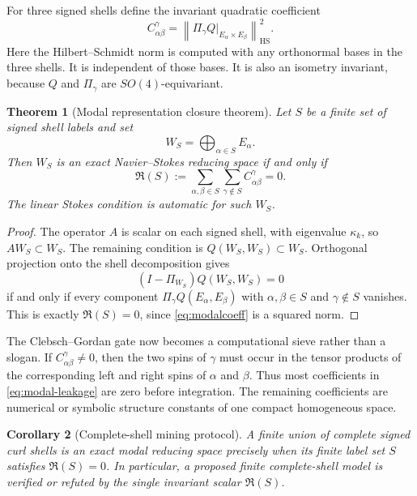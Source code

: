 \documentclass[aps,prd,reprint,superscriptaddress,nofootinbib,floatfix]{revtex4-2}
\newtheorem{theorem}{Theorem}
\newtheorem{corollary}[theorem]{Corollary}
\theoremstyle{definition}
\theoremstyle{remark}
\begin{document}
For three signed shells define the invariant quadratic coefficient
\begin{equation}
	C_{\alpha\beta}^{\gamma}
	=
	\left\|\Pi_\gamma Q\big|_{E_\alpha\times E_\beta}\right\|_{\mathrm{HS}}^2 .
	\label{eq:modalcoeff}
\end{equation}
Here the Hilbert--Schmidt norm is computed with any orthonormal bases in the three shells.  It is independent of those bases.  It is also an isometry invariant, because \(Q\) and \(\Pi_\gamma\) are \(SO(4)\)-equivariant.

\begin{theorem}[Modal representation closure theorem]\label{thm:modalclosure}
	Let \(S\) be a finite set of signed shell labels and set
	\[
		W_S=\bigoplus_{\alpha\in S}E_\alpha .
	\]
	Then \(W_S\) is an exact Navier--Stokes reducing space if and only if
	\begin{equation}
		\mathfrak R(S):=
		\sum_{\alpha,\beta\in S}\sum_{\gamma\notin S}
		C_{\alpha\beta}^{\gamma}=0.
		\label{eq:modal-leakage}
	\end{equation}
	The linear Stokes condition is automatic for such \(W_S\).
\end{theorem}

\begin{proof}
	The operator \(A\) is scalar on each signed shell, with eigenvalue \(\kappa_k\), so \(AW_S\subset W_S\).  The remaining condition is \(Q(W_S,W_S)\subset W_S\).  Orthogonal projection onto the shell decomposition gives
	\[
		(I-\Pi_{W_S})Q(W_S,W_S)=0
	\]
	if and only if every component \(\Pi_\gamma Q(E_\alpha,E_\beta)\) with \(\alpha,\beta\in S\) and \(\gamma\notin S\) vanishes.  This is exactly \(\mathfrak R(S)=0\), since \eqref{eq:modalcoeff} is a squared norm.
\end{proof}

The Clebsch--Gordan gate now becomes a computational sieve rather than a slogan.  If \(C_{\alpha\beta}^{\gamma}\ne0\), then the two spins of \(\gamma\) must occur in the tensor products of the corresponding left and right spins of \(\alpha\) and \(\beta\).  Thus most coefficients in \eqref{eq:modal-leakage} are zero before integration.  The remaining coefficients are numerical or symbolic structure constants of one compact homogeneous space.

\begin{corollary}[Complete-shell mining protocol]\label{cor:shellmining}
	A finite union of complete signed curl shells is an exact modal reducing space precisely when its finite label set \(S\) satisfies \(\mathfrak R(S)=0\).  In particular, a proposed finite complete-shell model is verified or refuted by the single invariant scalar \(\mathfrak R(S)\).
\end{corollary}
\end{document}
